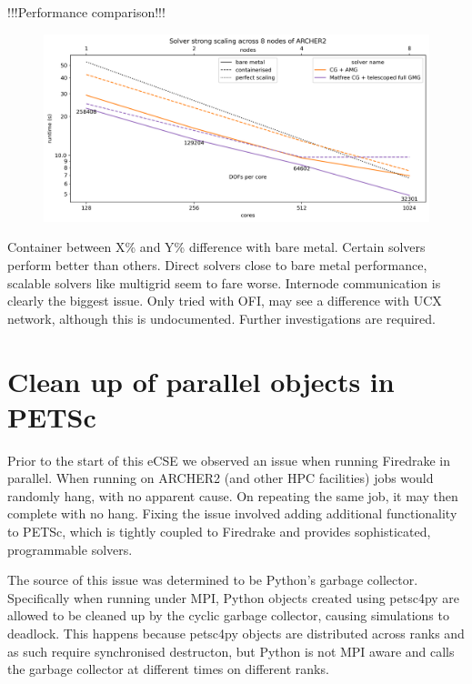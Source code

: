 \documentclass[a4paper,11pt]{article}
\begin{document}
!!!Performance comparison!!!
\begin{figure}[htp]
	\centering
	\includegraphics[width=\textwidth]{strong.png}
	\vspace{-1em}
	\caption{}
	\label{fig:sing_perf}
\end{figure}
Container between X\% and Y\% difference with bare metal.
Certain solvers perform better than others.
Direct solvers close to bare metal performance, scalable solvers like multigrid seem to fare worse.
Internode communication is clearly the biggest issue.
Only tried with OFI, may see a difference with UCX network, although this is undocumented.
Further investigations are required.


\section{Clean up of parallel objects in PETSc}
\label{sec:other}
Prior to the start of this eCSE we observed an issue when running Firedrake in parallel.
When running on ARCHER2 (and other HPC facilities) jobs would randomly hang, with no apparent cause.
On repeating the same job, it may then complete with no hang.
Fixing the issue involved adding additional functionality to PETSc, which is tightly coupled to Firedrake and provides sophisticated, programmable solvers\cite{petsc}.

The source of this issue was determined to be Python's garbage collector.
Specifically when running under MPI, Python objects created using petsc4py are allowed to be cleaned up by the cyclic garbage collector, causing simulations to deadlock.
This happens because petsc4py objects are distributed across ranks and as such require synchronised destructon, but Python is not MPI aware and calls the garbage collector at different times on different ranks.
\end{document}
